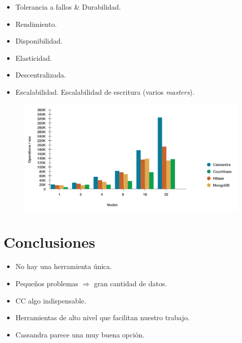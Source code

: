\documentclass[dvipsnames]{beamer}
\begin{document}
        \begin{frame}
          \begin{itemize}
          \item Tolerancia a fallos \& Durabilidad.
          \item Rendimiento.
          \item Disponibilidad.
          \item Elasticidad.
          \item Descentralizada.
          \item Escalabilidad. \textcolor{deepRed}{Escalabilidad de escritura} (varios \textit{masters}).
          \end{itemize}

          \begin{figure}[H]
            \centering
            \includegraphics[scale=0.08]{img/grafica.jpg}
          \end{figure}

        \end{frame}
        
        \section{Conclusiones}

        \begin{frame}
          \begin{itemize}
          \item No hay una herramienta única.
          \item Pequeños problemas $\Rightarrow$ gran cantidad de datos.
          \item CC algo indispensable.
          \item Herramientas de alto nivel que facilitan nuestro trabajo.
          \item Cassandra parece una muy buena opción.
          \end{itemize}
        \end{frame}
\end{document}
